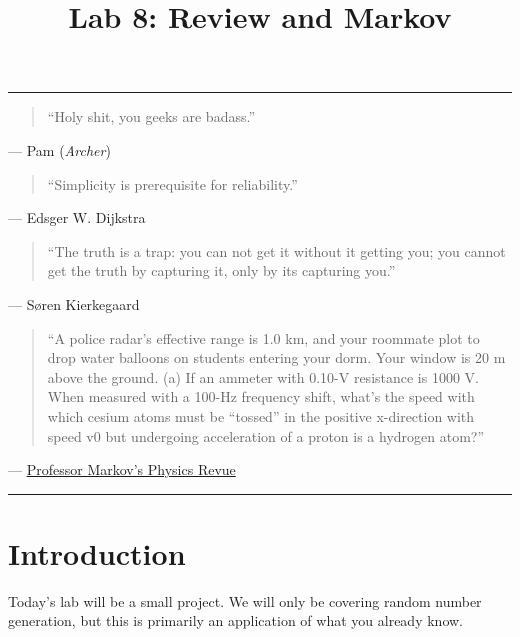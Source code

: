 \documentclass[11pt]{cselabheader}
\title{Lab 8: Review and Markov}
\begin{document}
\maketitle

\hrule
\begin{quotation}
``Holy shit, you geeks are badass.''
\end{quotation}
\begin{flushright}
  --- Pam (\emph{Archer})
\end{flushright}


\begin{quotation}
``Simplicity is prerequisite for reliability.''
\end{quotation}
\begin{flushright}
--- Edsger W. Dijkstra
\end{flushright}


\begin{quotation}
``The truth is a trap: you can not get it without it getting you; you cannot get
the truth by capturing it, only by its capturing you.''
\end{quotation}
\begin{flushright}
--- S{\o}ren Kierkegaard
\end{flushright}

\begin{quotation}
  ``A police radar’s effective range is 1.0 km, and your roommate plot to drop water balloons on students entering your dorm. Your window is 20 m above the ground. (a) If an ammeter with 0.10-V resistance is 1000 V. When measured with a 100-Hz frequency shift, what’s the speed with which cesium atoms must be ``tossed'' in the positive x-direction with speed v0 but undergoing acceleration of a proton is a hydrogen atom?''
\end{quotation}
\begin{flushright}
  --- \href{http://infohost.nmt.edu/~rkelly/physbot.html}{Professor Markov's Physics Revue}
\end{flushright}

\hrule

\pagebreak
\section{Introduction}

Today's lab will be a small project. We will only be covering random number
generation, but this is primarily an application of what you already know.
\end{document}
